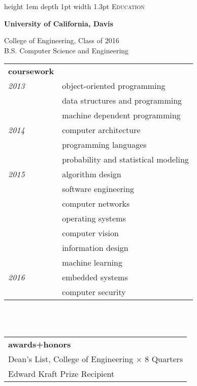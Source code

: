 \documentclass[letterpaper,10pt]{article}
\newcommand{\sectiontitle}[1]{
	{\color{magenta} \vline height 1em depth 1pt width 1.3pt}%
	{\large \colorbox{offwhite}{\color{black} \textsc{#1}}}
	\vspace*{0.5em}
}
\begin{document}
	\begin{minipage}[t]{0.30\textwidth}

		\sectiontitle{Education}

		\textbf{University of California, Davis}
		\\
		\begin{small}
			College of Engineering, Class of 2016\\
			B.S. Computer Science and Engineering
		\end{small}
		\vspace{0.3em}
		\begin{small}
			\begin{tabular}{l l}
				\textbf{coursework}\\
				\textit{2013} & object-oriented programming\\
				& data structures and programming\\
				& machine dependent programming\\
				\textit{2014} & computer architecture\\
				& programming languages\\
				& probability and statistical modeling\\
				\textit{2015} & algorithm design\\
				& software engineering\\
				& computer networks\\
				& operating systems\\
				& computer vision\\
				& information design\\
				& machine learning\\
				\textit{2016} & embedded systems\\
				& computer security\\
			\end{tabular}
			\\
			\vspace*{0.3em}
			\\
			\begin{tabular}{l}
				\textbf{awards+honors}\\
				Dean's List, College of Engineering $\times$ {8 Quarters}\\
				Edward Kraft Prize Recipient\\
			\end{tabular}
		\end{small}
		\vspace*{1em}


\end{minipage}
\end{document}
